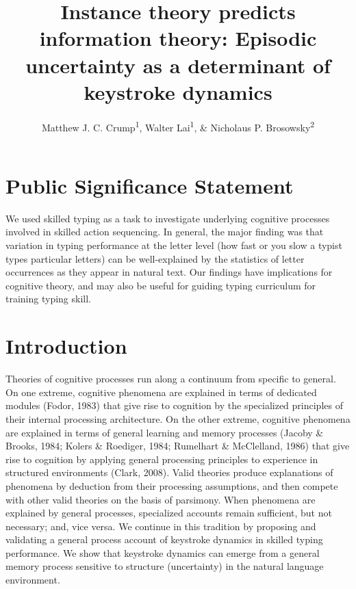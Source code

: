 \documentclass[,man,floatsintext]{apa6}
\title{Instance theory predicts information theory: Episodic uncertainty as a determinant of keystroke dynamics}
\author{Matthew J. C. Crump\textsuperscript{1}, Walter Lai\textsuperscript{1}, \& Nicholaus P. Brosowsky\textsuperscript{2}}
\date{}
\affiliation{
\vspace{0.5cm}
\textsuperscript{1} Brooklyn College of the City University of New York\\\textsuperscript{2} The Graduate Center of the City University of New York}
\begin{document}
\maketitle

\hypertarget{public-significance-statement}{%
\section{Public Significance Statement}\label{public-significance-statement}}

We used skilled typing as a task to investigate underlying cognitive processes involved in skilled action sequencing. In general, the major finding was that variation in typing performance at the letter level (how fast or you slow a typist types particular letters) can be well-explained by the statistics of letter occurrences as they appear in natural text. Our findings have implications for cognitive theory, and may also be useful for guiding typing curriculum for training typing skill.

\hypertarget{introduction}{%
\section{Introduction}\label{introduction}}

Theories of cognitive processes run along a continuum from specific to general. On one extreme, cognitive phenomena are explained in terms of dedicated modules (Fodor, 1983) that give rise to cognition by the specialized principles of their internal processing architecture. On the other extreme, cognitive phenomena are explained in terms of general learning and memory processes (Jacoby \& Brooks, 1984; Kolers \& Roediger, 1984; Rumelhart \& McClelland, 1986) that give rise to cognition by applying general processing principles to experience in structured environments (Clark, 2008). Valid theories produce explanations of phenomena by deduction from their processing assumptions, and then compete with other valid theories on the basis of parsimony. When phenomena are explained by general processes, specialized accounts remain sufficient, but not necessary; and, vice versa. We continue in this tradition by proposing and validating a general process account of keystroke dynamics in skilled typing performance. We show that keystroke dynamics can emerge from a general memory process sensitive to structure (uncertainty) in the natural language environment.
\end{document}
